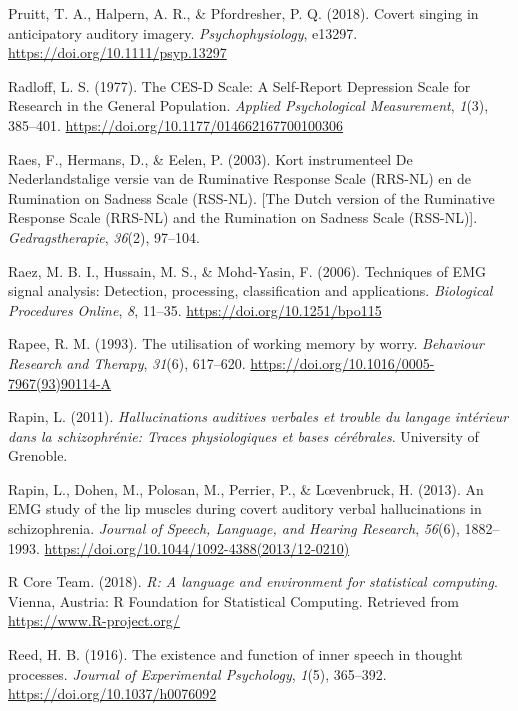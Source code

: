 \documentclass[a4paper,12pt,twoside,onecolumn,openright,final,oldfontcommands]{memoir}
\begin{document}
\leavevmode\hypertarget{ref-pruitt_covert_2018}{}%
Pruitt, T. A., Halpern, A. R., \& Pfordresher, P. Q. (2018). Covert singing in anticipatory auditory imagery. \emph{Psychophysiology}, e13297. \url{https://doi.org/10.1111/psyp.13297}

\leavevmode\hypertarget{ref-radloff_ces-d_1977}{}%
Radloff, L. S. (1977). The CES-D Scale: A Self-Report Depression Scale for Research in the General Population. \emph{Applied Psychological Measurement}, \emph{1}(3), 385--401. \url{https://doi.org/10.1177/014662167700100306}

\leavevmode\hypertarget{ref-raes_kort_2003}{}%
Raes, F., Hermans, D., \& Eelen, P. (2003). Kort instrumenteel De Nederlandstalige versie van de Ruminative Response Scale (RRS-NL) en de Rumination on Sadness Scale (RSS-NL). {[}The Dutch version of the Ruminative Response Scale (RRS-NL) and the Rumination on Sadness Scale (RSS-NL){]}. \emph{Gedragstherapie}, \emph{36}(2), 97--104.

\leavevmode\hypertarget{ref-raez_techniques_2006}{}%
Raez, M. B. I., Hussain, M. S., \& Mohd-Yasin, F. (2006). Techniques of EMG signal analysis: Detection, processing, classification and applications. \emph{Biological Procedures Online}, \emph{8}, 11--35. \url{https://doi.org/10.1251/bpo115}

\leavevmode\hypertarget{ref-rapee_utilisation_1993}{}%
Rapee, R. M. (1993). The utilisation of working memory by worry. \emph{Behaviour Research and Therapy}, \emph{31}(6), 617--620. \url{https://doi.org/10.1016/0005-7967(93)90114-A}

\leavevmode\hypertarget{ref-Rapin2011}{}%
Rapin, L. (2011). \emph{Hallucinations auditives verbales et trouble du langage intérieur dans la schizophrénie: Traces physiologiques et bases cérébrales}. University of Grenoble.

\leavevmode\hypertarget{ref-Rapin2013}{}%
Rapin, L., Dohen, M., Polosan, M., Perrier, P., \& Lœvenbruck, H. (2013). An EMG study of the lip muscles during covert auditory verbal hallucinations in schizophrenia. \emph{Journal of Speech, Language, and Hearing Research}, \emph{56}(6), 1882--1993. \url{https://doi.org/10.1044/1092-4388(2013/12-0210)}

\leavevmode\hypertarget{ref-R-base}{}%
R Core Team. (2018). \emph{R: A language and environment for statistical computing}. Vienna, Austria: R Foundation for Statistical Computing. Retrieved from \url{https://www.R-project.org/}

\leavevmode\hypertarget{ref-reed_existence_1916}{}%
Reed, H. B. (1916). The existence and function of inner speech in thought processes. \emph{Journal of Experimental Psychology}, \emph{1}(5), 365--392. \url{https://doi.org/10.1037/h0076092}
\end{document}
